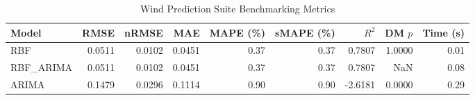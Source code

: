 \begin{table}[htbp]
\centering
\caption{Wind Prediction Suite Benchmarking Metrics}
\label{tab:wind_prediction_summary}
\begin{tabular}{lrrrrrrrr}
\toprule
Model & RMSE & nRMSE & MAE & MAPE (\%) & sMAPE (\%) & $R^2$ & DM $p$ & Time (s) \\
\midrule
RBF & 0.0511 & 0.0102 & 0.0451 & 0.37 & 0.37 & 0.7807 & 1.0000 & 0.01 \\
RBF_ARIMA & 0.0511 & 0.0102 & 0.0451 & 0.37 & 0.37 & 0.7807 & NaN & 0.08 \\
ARIMA & 0.1479 & 0.0296 & 0.1114 & 0.90 & 0.90 & -2.6181 & 0.0000 & 0.29 \\
\bottomrule
\end{tabular}
\end{table}
